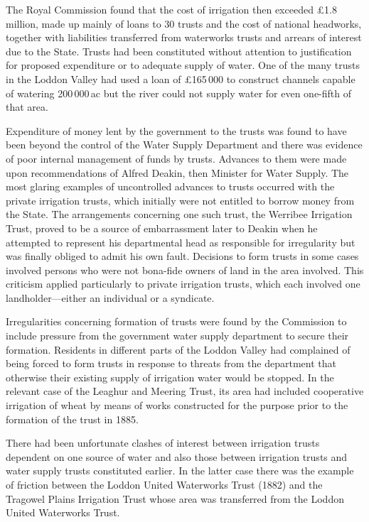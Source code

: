 The Royal Commission found that the cost of irrigation then exceeded
\pounds1.8\,million, made up mainly of loans to 30 trusts and the cost of
national headworks, together with liabilities transferred from
waterworks trusts and arrears of interest due to the State.  Trusts
had been constituted without attention to justification for proposed
expenditure or to adequate supply of water.  One of the many trusts in
the Loddon Valley had used a loan of \pounds165\,000 to construct
channels capable of watering 200\,000\,ac but the river could not
supply water for even one-fifth of that area.

Expenditure of money lent by the government to the trusts was found to
have been beyond the control of the Water Supply Department and there
was evidence of poor internal management of funds by trusts.  Advances
to them were made upon recommendations of Alfred Deakin, then Minister
for Water Supply.  The most glaring examples of uncontrolled advances
to trusts occurred with the private irrigation trusts, which initially
were not entitled to borrow money from the State.  The arrangements
concerning one such trust, the Werribee Irrigation Trust, proved to be
a source of embarrassment later to Deakin when he attempted to
represent his departmental head as responsible for irregularity but
was finally obliged to admit his own fault.  Decisions to form trusts
in some cases involved persons who were not bona-fide owners of land
in the area involved.  This criticism applied particularly to private
irrigation trusts, which each involved one landholder---either an
individual or a syndicate.

Irregularities concerning formation of trusts were found by the
Commission to include pressure from the government water supply
department to secure their formation.  Residents in different parts of
the Loddon Valley had complained of being forced to form trusts in
response to threats from the department that otherwise their existing
supply of irrigation water would be stopped.  In the relevant case of
the Leaghur and Meering Trust, its area had included cooperative
irrigation of wheat by means of works constructed for the purpose
prior to the formation of the trust in 1885.

There had been unfortunate clashes of interest between irrigation
trusts dependent on one source of water and also those between
irrigation trusts and water supply trusts constituted earlier.  In the
latter case there was the example of friction between the Loddon
United Waterworks Trust (1882) and the Tragowel Plains Irrigation
Trust whose area was transferred from the Loddon United Waterworks
Trust.


